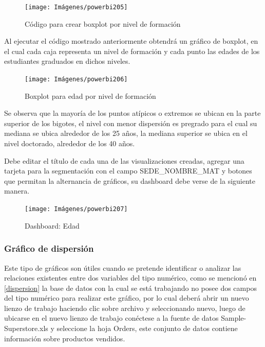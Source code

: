 \documentclass[
]{book}
\begin{document}
\begin{figure}

{\centering \texttt{[image: Imágenes/powerbi205]} 

}

\caption{Código para crear boxplot por nivel de formación}\label{fig:codigoboxplotpowerbi-fig}
\end{figure}

Al ejecutar el código mostrado anteriormente obtendrá un gráfico de boxplot, en el cual cada caja representa un nivel de formación y cada punto las edades de los estudiantes graduados en dichos niveles.

\begin{figure}

{\centering \texttt{[image: Imágenes/powerbi206]} 

}

\caption{Boxplot para edad por nivel de formación}\label{fig:boxplotpowerbi-fig}
\end{figure}

Se observa que la mayoría de los puntos atípicos o extremos se ubican en la parte superior de los bigotes, el nivel con menor dispersión es pregrado para el cual su mediana se ubica alrededor de los 25 años, la mediana superior se ubica en el nivel doctorado, alrededor de los 40 años.

Debe editar el título de cada una de las visualizaciones creadas, agregar una tarjeta para la segmentación con el campo SEDE\_NOMBRE\_MAT y botones que permitan la alternancia de gráficos, su dashboard debe verse de la siguiente manera.

\begin{figure}

{\centering \texttt{[image: Imágenes/powerbi207]} 

}

\caption{Dashboard: Edad}\label{fig:tableroedad-fig}
\end{figure}

\hypertarget{gruxe1fico-de-dispersiuxf3n}{%
\subsubsection{Gráfico de dispersión}\label{gruxe1fico-de-dispersiuxf3n}}

Este tipo de gráficos son útiles cuando se pretende identificar o analizar las relaciones existentes entre dos variables del tipo numérico, como se mencionó en \ref{dispersion} la base de datos con la cual se está trabajando no posee dos campos del tipo numérico para realizar este gráfico, por lo cual deberá abrir un nuevo lienzo de trabajo haciendo clic sobre archivo y seleccionando nuevo, luego de ubicarse en el nuevo lienzo de trabajo conéctese a la fuente de datos Sample-Superstore.xls y seleccione la hoja Orders, este conjunto de datos contiene información sobre productos vendidos.
\end{document}
